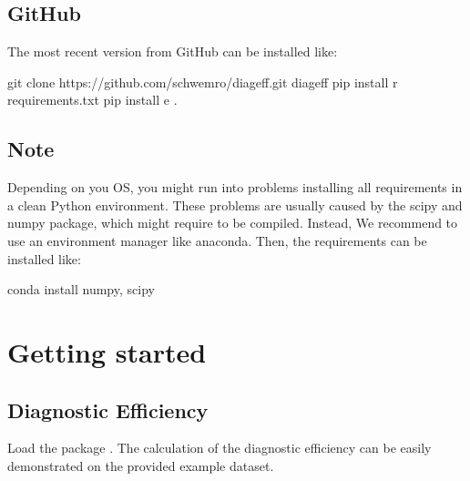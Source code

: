 \documentclass[letterpaper,10pt,english]{sphinxmanual}
\begin{document}
\subsection{GitHub}
\label{\detokenize{install:github}}
The most recent version from GitHub can be installed like:

\begin{sphinxVerbatim}[commandchars=\\\{\}]
git clone https://github.com/schwemro/diag\PYGZhy{}eff.git
 diag\PYGZhy{}eff
pip install \PYGZhy{}r requirements.txt
pip install \PYGZhy{}e .
\end{sphinxVerbatim}


\subsection{Note}
\label{\detokenize{install:note}}
Depending on you OS, you might run into problems installing all requirements
in a clean Python environment. These problems are usually caused by the scipy
and numpy package, which might require to be compiled. Instead, We recommend to
use an environment manager like anaconda.
Then, the requirements can be installed like:

\begin{sphinxVerbatim}[commandchars=\\\{\}]
conda install numpy, scipy
\end{sphinxVerbatim}


\section{Getting started}
\label{\detokenize{getting_started:getting-started}}\label{\detokenize{getting_started::doc}}

\subsection{Diagnostic Efficiency}
\label{\detokenize{getting_started:diagnostic-efficiency}}
Load the package . The calculation of the diagnostic efficiency
can be easily demonstrated on the provided example dataset.
\end{document}
